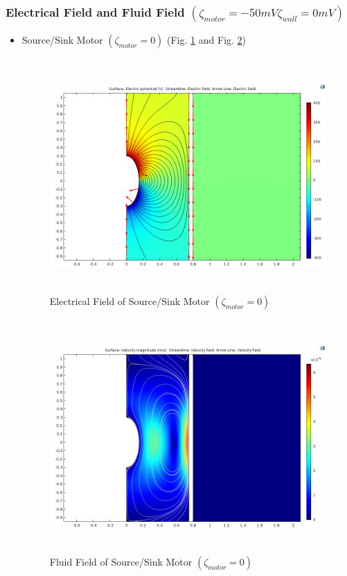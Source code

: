 \documentclass[fontsize=11pt, %
                             paper=a4, %
                             twoside, %
                             captions=tableheading,
                             index=totoc,
                             hyperref]{labbook}
\begin{document}
\begin{addmargin}[4cm]{0cm}
\subsubsection*{Electrical Field and Fluid Field $(\zeta_{motor}=-50mV \zeta_{wall}= 0 mV)$}
\begin{itemize}
\item Source/Sink Motor $(\zeta_{motor}=0)$ (Fig. \ref{2016-11-13-EFOSSMM0} and Fig. \ref{2016-11-13-FFOSSMM0})
\begin{figure}
\centering
\includegraphics[width=\linewidth, height=3.5in]{2016-11-13-SourceSink-E-Osmosis.png}
\caption{Electrical Field of Source/Sink Motor $(\zeta_{motor}=0)$}\label{2016-11-13-EFOSSMM0}
\end{figure}
\begin{figure}
\centering
\includegraphics[width=\linewidth, height=3.5in]{2016-11-13-SourceSink-V-Osmosis.png}
\caption{Fluid Field of Source/Sink Motor $(\zeta_{motor}=0)$}\label{2016-11-13-FFOSSMM0}

\end{figure}
\end{itemize}
\end{addmargin}
\end{document}
